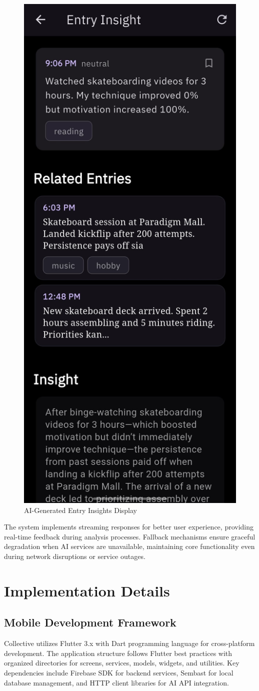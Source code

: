 \documentclass[conference]{IEEEtran}
\begin{document}
\begin{figure}[H]
\centering
\includegraphics[width=0.45\columnwidth]{entry_insight_screen.jpeg}
\caption{AI-Generated Entry Insights Display}
\label{fig:ai-insights}
\end{figure}

The system implements streaming responses for better user experience, providing real-time feedback during analysis processes. Fallback mechanisms ensure graceful degradation when AI services are unavailable, maintaining core functionality even during network disruptions or service outages.

\section{Implementation Details}

\subsection{Mobile Development Framework}

Collective utilizes Flutter 3.x with Dart programming language for cross-platform development. The application structure follows Flutter best practices with organized directories for screens, services, models, widgets, and utilities. Key dependencies include Firebase SDK for backend services, Sembast for local database management, and HTTP client libraries for AI API integration.
\end{document}
